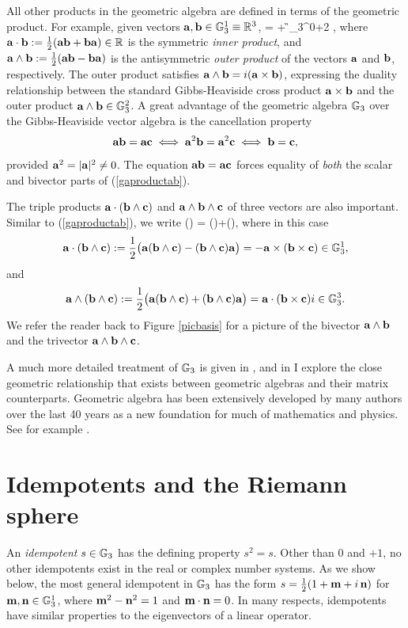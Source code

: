 \documentclass[]{article}
\begin{document}
All other products in the geometric algebra are defined in terms of the geometric product.
For example, given vectors $\mathbf{a}, \mathbf{b} \in \mathbb{G}_3^1\equiv\mathbb{R}^3$,
\beq \ba \bb = \ba \cdot \bb + \ba \w \bb \in \G_3^{0+2} ,      \label{gaproductab}  \eeq
where $\mathbf{a}\cdot \mathbf{b} :=\frac{1}{2}(\mathbf{a} \mathbf{b} + \mathbf{b} \mathbf{a})\in \mathbb{R}$ is the symmetric {\it inner product}, and
$\mathbf{a} \wedge \mathbf{b} := \frac{1}{2}(\mathbf{a} \mathbf{b}-\mathbf{b} \mathbf{a})$ is the antisymmetric {\it outer product} of the vectors
$\mathbf{a}$ and $\mathbf{b}$, respectively. The outer product satisfies $\mathbf{a}\wedge \mathbf{b} = i(\mathbf{a} \times \mathbf{b})$, expressing
the duality relationship between the standard Gibbs-Heaviside cross product $\mathbf{a} \times \mathbf{b}$ and the
outer product $\mathbf{a} \wedge \mathbf{b} \in \mathbb{G}_3^2$. A great advantage of the geometric algebra $\mathbb{G}_3$ over the
Gibbs-Heaviside vector algebra is the cancellation property
\[  \mathbf{a} \mathbf{b} = \mathbf{a} \mathbf{c} \iff \mathbf{a}^2\mathbf{b} = \mathbf{a}^2\mathbf{c} \iff \mathbf{b} = \mathbf{c}, \]
provided $\mathbf{a}^2=|\mathbf{a}|^2 \ne 0$. The equation $\mathbf{a} \mathbf{b} = \mathbf{a} \mathbf{c}$ forces equality of {\it both}
the scalar and bivector parts of (\ref{gaproductab}).

The triple products $\mathbf{a} \cdot (\mathbf{b} \wedge \mathbf{c})$ and $\mathbf{a} \wedge \mathbf{b} \wedge \mathbf{c}$ of three
vectors are also important. Similar to (\ref{gaproductab}), we write
\beq \ba (\bb \w \bc) = \ba \cdot (\bb\w \bc)+\ba \w (\bb \w \bc), \label{gaproductabc} \eeq
where in this case
\[ \mathbf{a} \cdot (\mathbf{b} \wedge \mathbf{c}):=\frac{1}{2}\big(\mathbf{a} (\mathbf{b} \wedge \mathbf{c})-(\mathbf{b}\wedge \mathbf{c})\mathbf{a}\big)= - \mathbf{a} \times(\mathbf{b} \times \mathbf{c})\in \mathbb{G}_3^1, \]
and
\[ \mathbf{a} \wedge (\mathbf{b} \wedge \mathbf{c}):=\frac{1}{2}\big(\mathbf{a} (\mathbf{b} \wedge \mathbf{c})+(\mathbf{b}\wedge \mathbf{c})\mathbf{a}\big)=  \mathbf{a} \cdot (\mathbf{b} \times \mathbf{c})
 i\in \mathbb{G}_3^3. \]
 We refer the reader back to Figure \ref{picbasis} for a picture of the bivector $\mathbf{a}\wedge \mathbf{b}$ and the
 trivector $\mathbf{a} \wedge \mathbf{b} \wedge \mathbf{c}$.
 
A much more detailed treatment of $\mathbb{G}_3$ is given in \cite[Chp.3]{SNF}, and in \cite{S08} I explore the close geometric
relationship that exists between geometric algebras and their matrix counterparts. 
Geometric algebra has been extensively developed by many authors over the last 40 years as 
 a new foundation for much of mathematics and physics. See for example \cite{SNF,H/S,H99,LP97}.


\section{Idempotents and the Riemann sphere}

An {\it idempotent} $s \in \mathbb{G}_3$ has the defining property $s^2=s$. Other than $0$ and $+1$, no other
idempotents exist in the real or complex number systems. As we show below, the most general idempotent in $\mathbb{G}_3$ has 
the form $s=\frac{1}{2}(1+\mathbf{m} + i\, \mathbf{n})$ for $\mathbf{m},\mathbf{n} \in \mathbb{G}_3^1$, where $\mathbf{m}^2- \mathbf{n}^2=1$ and $\mathbf{m} \cdot \mathbf{n} = 0 $.
 In many respects, idempotents have
similar properties to the eigenvectors of a linear operator. 
\end{document}
